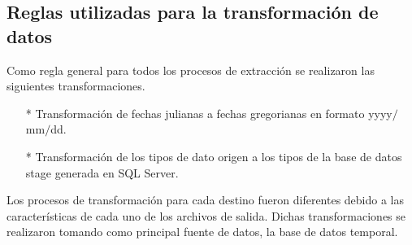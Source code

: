 \documentclass[a4paper,openright,12pt]{book}
\begin{document}
\subsection{Reglas utilizadas para la transformaci\'on de datos}
Como regla general para todos los procesos de extracci\'on se realizaron las siguientes transformaciones. 
\begin{itemize}
\item[*] Transformaci\'on de fechas julianas a fechas gregorianas en formato yyyy$/$mm$/$dd.
\item[*] Transformaci\'on de los tipos de dato origen a los tipos de la base de datos stage generada en SQL Server.
\end{itemize}

Los procesos de transformaci\'on para cada destino fueron diferentes debido a las caracter\'isticas de cada uno de los archivos de salida. Dichas transformaciones se realizaron tomando como principal fuente de datos, la base de datos temporal. 
\end{document}
